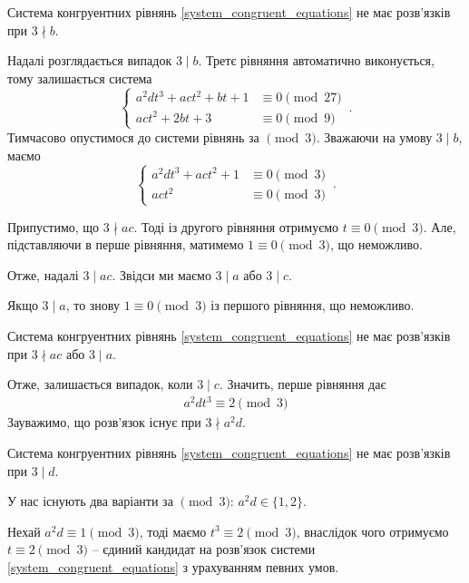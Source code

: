 \documentclass{thesis}
\begin{document}
\begin{lemma}
Система конгруентних рівнянь \eqref{system_congruent_equations} не має розв'язків при $3 \nmid b$.
\end{lemma}

Надалі розглядається випадок $3 \mid b$. Третє рівняння автоматично виконується, тому залишається система
\begin{equation}
\label{system_congruent_equations}
    \begin{cases}
      a^2 d t^3 + ac t^2 + bt + 1 & \equiv 0 \pmod {27} \\
      act^2 + 2bt + 3 & \equiv 0 \pmod {9} 
    \end{cases}\,.
\end{equation}
Тимчасово опустимося до системи рівнянь за $\pmod 3$. Зважаючи на умову $3 \mid b$, маємо
\begin{equation*}
\label{system_congruent_equations}
    \begin{cases}
      a^2 d t^3 + ac t^2 + 1 & \equiv 0 \pmod {3} \\
      act^2 & \equiv 0 \pmod {3} 
    \end{cases}\,.
\end{equation*}

Припустимо, що $3 \nmid ac$. Тоді із другого рівняння отримуємо $t \equiv 0 \pmod 3$. Але, підставляючи в перше рівняння, матимемо $1 \equiv 0 \pmod 3$, що неможливо.

Отже, надалі $3 \mid ac$. Звідси ми маємо $3 \mid a$ або $3 \mid c$.

Якщо $3 \mid a$, то знову $1 \equiv 0 \pmod 3$ із першого рівняння, що неможливо.

\begin{lemma}
Система конгруентних рівнянь \eqref{system_congruent_equations} не має розв'язків при $3 \nmid ac$ або $3 \mid a$.
\end{lemma}

Отже, залишається випадок, коли $3 \mid c$. Значить, перше рівняння дає
\begin{align*}
a^2 dt^3 \equiv 2 \pmod 3
\end{align*}
Зауважимо, що розв'язок існує при $3 \nmid a^2d$.
\begin{corollary}
Система конгруентних рівнянь \eqref{system_congruent_equations} не має розв'язків при $3 \mid d$.
\end{corollary}

У нас існують два варіанти за $\pmod 3$: $a^2 d \in \{1,2\}$.

Нехай $a^2 d \equiv 1 \pmod 3$, тоді маємо $t^3 \equiv 2 \pmod 3$, внаслідок чого отримуємо $t \equiv 2 \pmod 3$ -- єдиний кандидат на розв'язок системи \eqref{system_congruent_equations} з урахуванням певних умов.
\end{document}
